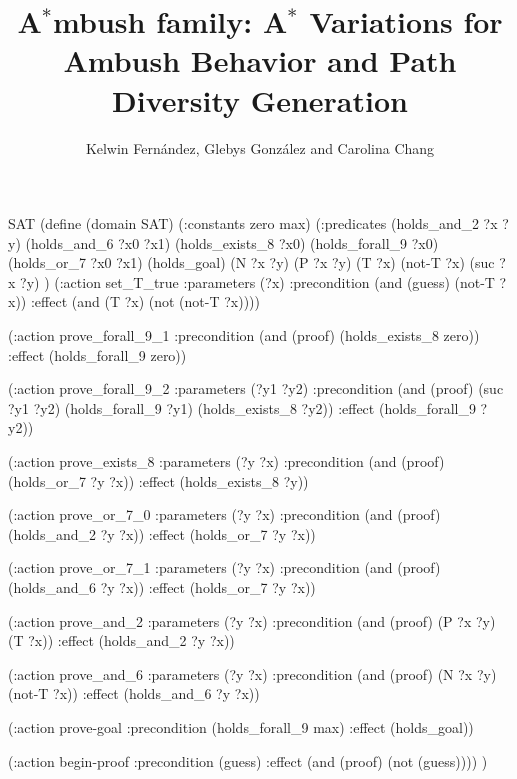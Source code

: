 \documentclass[portrait]{sciposter}
\title{A$^*$mbush family: A$^*$ Variations for Ambush 
Behavior and Path Diversity Generation}
\author{Kelwin Fern\'andez, Glebys Gonz\'alez and Carolina Chang}
\institute{Universidad Sim\'on Bol\'ivar\\
           Caracas, Venezuela}
\begin{document}
\begin{SaveVerbatim}{SAT}
(define (domain SAT)
  (:constants zero max)
  (:predicates
    (holds_and_2 ?x ?y) (holds_and_6 ?x0 ?x1)
    (holds_exists_8 ?x0) (holds_forall_9 ?x0)
    (holds_or_7 ?x0 ?x1) (holds_goal)
    (N ?x ?y) (P ?x ?y) (T ?x) (not-T ?x)
    (suc ?x ?y)
  )
  (:action set_T_true
    :parameters (?x)
    :precondition (and (guess) (not-T ?x))
    :effect (and (T ?x) (not (not-T ?x))))

  (:action prove_forall_9_1
    :precondition (and (proof)
                       (holds_exists_8 zero))
    :effect (holds_forall_9 zero))

  (:action prove_forall_9_2
    :parameters (?y1 ?y2)
    :precondition (and (proof)
                       (suc ?y1 ?y2)
                       (holds_forall_9 ?y1)
                       (holds_exists_8 ?y2))
    :effect (holds_forall_9 ?y2))

  (:action prove_exists_8
    :parameters (?y ?x)
    :precondition (and (proof)
                       (holds_or_7 ?y ?x))
    :effect (holds_exists_8 ?y))

  (:action prove_or_7_0
    :parameters (?y ?x)
    :precondition (and (proof)
                       (holds_and_2 ?y ?x))
    :effect (holds_or_7 ?y ?x))

  (:action prove_or_7_1
    :parameters (?y ?x)
    :precondition (and (proof)
                       (holds_and_6 ?y ?x))
    :effect (holds_or_7 ?y ?x))

  (:action prove_and_2
    :parameters (?y ?x)
    :precondition (and (proof)
                       (P ?x ?y) (T ?x))
    :effect (holds_and_2 ?y ?x))

  (:action prove_and_6
    :parameters (?y ?x)
    :precondition (and (proof)
                       (N ?x ?y) (not-T ?x))
    :effect (holds_and_6 ?y ?x))

  (:action prove-goal
    :precondition (holds_forall_9 max)
    :effect (holds_goal))

  (:action begin-proof
    :precondition (guess)
    :effect (and (proof) (not (guess)))) )
\end{SaveVerbatim}

\end{document}
